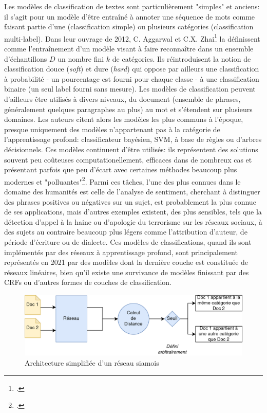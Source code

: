 Les modèles de classification de textes sont particulièrement "simples" et anciens: il s'agit pour un modèle d'être entraîné à annoter une séquence de mots comme faisant partie d'une (classification simple) ou plusieurs catégories (classification multi-label). Dans leur ouvrage de 2012, C. Aggarwal et C.X. Zhai\footcite{aggarwal_survey_2012} la définissent comme l'entraînement d'un modèle visant à faire reconnaître dans un ensemble d'échantillons $D$ un nombre fini $k$ de catégories. Ils réintroduisent la notion de classification douce (\textit{soft}) et dure (\textit{hard}) qui oppose par ailleurs une classification à probabilité - un pourcentage est fourni pour chaque classe - à une classification binaire (un seul label fourni sans mesure). Les modèles de classification peuvent d'ailleurs être utilisés à divers niveaux, du document (ensemble de phrases, généralement quelques paragraphes au plus) au mot et s'étendent sur plusieurs domaines. Les auteurs citent alors les modèles les plus communs à l'époque, presque uniquement des modèles n'appartenant pas à la catégorie de l'apprentissage profond: classificateur bayésien, SVM, à base de règles ou d'arbres décisionnels. Ces modèles continuent d'être utilisés: ils représentent des solutions souvent peu coûteuses computationellement, efficaces dans de nombreux cas et présentant parfois que peu d'écart avec certaines méthodes beaucoup plus modernes et "polluantes"\footcite{fell_comparing_2019}. Parmi ces tâches, l'une des plus connues dans le domaine des humanités est celle de l'analyse de sentiment, cherchant à distinguer des phrases positives ou négatives sur un sujet, est probablement la plus connue de ses applications, mais d'autres exemples existent, des plus sensibles, tels que la détection d'appel à la haine ou d'apologie du terrorisme sur les réseaux sociaux, à des sujets au contraire beaucoup plus légers comme l'attribution d'auteur, de période d'écriture ou de dialecte. Ces modèles de classifications, quand ils sont implémentés par des réseaux à apprentissage profond, sont principalement représentés en 2021 par des modèles dont la dernière couche est constituée de réseaux linéaires, bien qu'il existe une survivance de modèles finissant par des CRFs ou d'autres formes de couches de classification.

\begin{figure}
    \centering
    \includegraphics[width=\linewidth]{figures/chap4/Siamois.png}
    \caption{Architecture simplifiée d'un réseau siamois}
    \label{fig:chap4:structures:siamese-network}
\end{figure}

